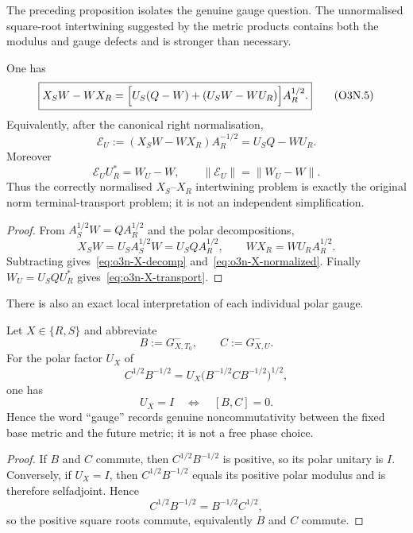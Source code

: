 The preceding proposition isolates the genuine gauge question.  The unnormalised
square-root intertwining suggested by the metric products contains both the modulus and
gauge defects and is stronger than necessary.

\begin{proposition}\label{prop:o3n-X-decomp}
One has
\[
 \boxed{
 X_SW-WX_R
 =\Bigl[U_S(Q-W)+(U_SW-WU_R)\Bigr]A_R^{1/2}.
 }
\tag{O3N.5}\label{eq:o3n-X-decomp}
\]
Equivalently, after the canonical right normalisation,
\[
 \boxed{
 \mathcal E_U
 :=(X_SW-WX_R)A_R^{-1/2}
 =U_SQ-WU_R.
 }
\tag{O3N.6}\label{eq:o3n-X-normalized}
\]
Moreover
\[
 \boxed{
 \mathcal E_UU_R^*=W_U-W,
 \qquad
 \|\mathcal E_U\|=\|W_U-W\|.
 }
\tag{O3N.7}\label{eq:o3n-X-transport}
\]
Thus the correctly normalised $X_S$--$X_R$ intertwining problem is exactly the original
norm terminal-transport problem; it is not an independent simplification.
\end{proposition}

\begin{proof}
From $A_S^{1/2}W=QA_R^{1/2}$ and the polar decompositions,
\[
 X_SW=U_SA_S^{1/2}W=U_SQA_R^{1/2},
 \qquad
 WX_R=WU_RA_R^{1/2}.
\]
Subtracting gives~\eqref{eq:o3n-X-decomp} and~\eqref{eq:o3n-X-normalized}.  Finally
$W_U=U_SQU_R^*$ gives~\eqref{eq:o3n-X-transport}.
\end{proof}

There is also an exact local interpretation of each individual polar gauge.

\begin{proposition}
\label{prop:o3n-gauge-commutator}
Let $X\in\{R,S\}$ and abbreviate
\[
 B:=G_{X,T_0}^-,\qquad C:=G_{X,U}^-.
\]
For the polar factor $U_X$ of
\[
 C^{1/2}B^{-1/2}=U_X
 \bigl(B^{-1/2}CB^{-1/2}\bigr)^{1/2},
\]
one has
\[
 \boxed{
 U_X=I
 \quad\Longleftrightarrow\quad
 [B,C]=0.
 }
\tag{O3N.8}\label{eq:o3n-gauge-commutator}
\]
Hence the word ``gauge'' records genuine noncommutativity between the fixed base metric
and the future metric; it is not a free phase choice.
\end{proposition}

\begin{proof}
If $B$ and $C$ commute, then $C^{1/2}B^{-1/2}$ is positive, so its polar unitary is
$I$.  Conversely, if $U_X=I$, then $C^{1/2}B^{-1/2}$ equals its positive polar modulus
and is therefore selfadjoint.  Hence
\[
 C^{1/2}B^{-1/2}=B^{-1/2}C^{1/2},
\]
so the positive square roots commute, equivalently $B$ and $C$ commute.
\end{proof}

